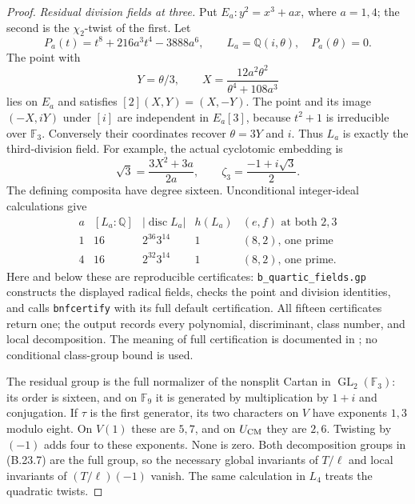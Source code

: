 \begin{proof}
\emph{Residual division fields at three.}
Put $E_a:y^2=x^3+ax$, where $a=1,4$; the second is the
$\chi_2$-twist of the first. Let
\[
 P_a(t)=t^8+216a^3t^4-3888a^6,\qquad
 L_a=\mathbb Q(i,\theta),\quad P_a(\theta)=0.
\]
The point with
\[
 Y=\theta/3,\qquad
 X=\frac{12a^2\theta^2}{\theta^4+108a^3}
                                                               \tag{B.23.5}
\]
lies on $E_a$ and satisfies $[2](X,Y)=(X,-Y)$.
The point and its image $(-X,iY)$ under $[i]$ are independent
in $E_a[3]$, because $t^2+1$ is irreducible over $\mathbb F_3$.
Conversely their coordinates recover $\theta=3Y$ and $i$.
Thus $L_a$ is exactly the third-division field. For example,
the actual cyclotomic embedding is
\[
 \sqrt3=\frac{3X^2+3a}{2a},\qquad
 \zeta_3=\frac{-1+i\sqrt3}{2}.
                                                               \tag{B.23.6}
\]
The defining composita have degree sixteen. Unconditional
integer-ideal calculations give
\[
 \begin{array}{c|c|c|c|c}
 a&[L_a:\mathbb Q]&|\operatorname{disc}L_a|&
            h(L_a)&(e,f)\text{ at both }2,3\\ \hline
 1&16&2^{36}3^{14}&1&(8,2)\text{, one prime}\\
 4&16&2^{32}3^{14}&1&(8,2)\text{, one prime}.
 \end{array}                                                    \tag{B.23.7}
\]
Here and below these are reproducible certificates:
\texttt{b\_quartic\_fields.gp} constructs the displayed radical
fields, checks the point and division identities, and calls
\texttt{bnfcertify} with its full default certification.
All fifteen certificates return one; the output records every
polynomial, discriminant, class number, and local decomposition.
The meaning of full certification is documented in
\citet[\texttt{bnfcertify}]{BPARI2026}; no conditional class-group
bound is used.

The residual group is the full normalizer of the nonsplit
Cartan in $\operatorname{GL}_2(\mathbb F_3)$: its order is
sixteen, and on $\mathbb F_9$ it is generated by multiplication
by $1+i$ and conjugation. If $\tau$ is the first generator,
its two characters on $V$ have exponents $1,3$ modulo eight.
On $V(1)$ these are $5,7$, and on $U_{\rm CM}$ they are $2,6$.
Twisting by $(-1)$ adds four to these exponents. None is zero.
Both decomposition groups in (B.23.7) are the full group,
so the necessary global invariants of $T/\ell$ and local
invariants of $(T/\ell)(-1)$ vanish. The same calculation in
$L_4$ treats the quadratic twists.


\end{proof}

